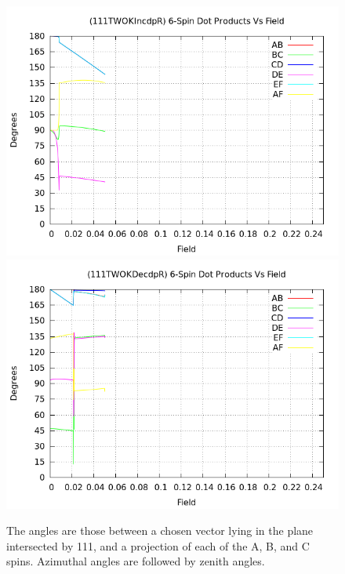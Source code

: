 \documentclass{article}
\begin{document}
\begin{figure}
\centering
\includegraphics[scale=0.27]{HVariedData/Pictures/111TWOKIncdpR.png}
\includegraphics[scale=0.27]{HVariedData/Pictures/111TWOKDecdpR.png}
\caption{The angles are those between a chosen vector lying in the plane intersected by 111,
and a projection of each of the A, B, and C spins. Azimuthal angles are followed by zenith angles.}
\end{figure}
\end{document}
